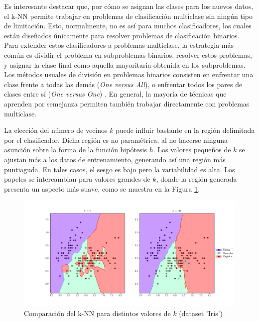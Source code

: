 Es interesante destacar que, por cómo se asignan las clases para los nuevos datos, el k-NN permite trabajar en problemas de clasificación multiclase sin ningún tipo de limitación. Esto, normalmente, no es así para muchos clasificadores, los cuales están diseñados únicamente para resolver problemas de clasificación binarios. Para extender estos clasificadores a problemas multiclase, la estrategia más común es dividir el problema en subproblemas binarios, resolver estos problemas, y asignar la clase final como aquella mayoritaria obtenida en los subproblemas. Los métodos usuales de división en problemas binarios consisten en enfrentar una clase frente a todas las demás (\emph{One versus All}), o enfrentar todos los pares de clases entre sí (\emph{One versus One}) \cite{ovoova}. En general, la mayoría de técnicas que aprenden por semejanza permiten también trabajar directamente con problemas multiclase.

La elección del número de vecinos $k$ puede influir bastante en la región delimitada por el clasificador. Dicha región es no paramétrica, al no hacerse ninguna asunción sobre la forma de la función hipótesis $h$. Los valores pequeños de $k$  se ajustan más a los datos de entrenamiento, generando así una región más puntiaguda. En tales casos, el sesgo es bajo pero la variabilidad es alta. Los papeles se intercambian para valores grandes de $k$, donde la región generada presenta un aspecto más suave, como se muestra en la Figura \ref{fig:knn_comp_k}.

\begin{figure}[h]
    \centering
    \includegraphics[width=\textwidth]{./images/compare_knn.png}
    \caption{Comparación del k-NN para distintos valores de $k$ (dataset 'Iris')} \label{fig:knn_comp_k}
\end{figure}

